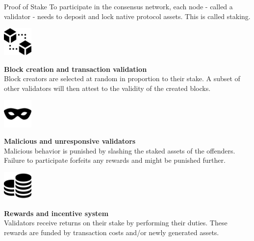 \documentclass[]{beamer}
\begin{document}
	\begin{frame}{Proof of Stake}
		\small
		To participate in the consensus network, each node - called a validator - needs to \color{focus} deposit and lock native protocol assets\color{black}. This is called staking.
		
		\pause
		\vspace{1.5 em}
		\begin{minipage}{0.2\textwidth}
			\begin{center}
				\includegraphics[height=4em]{../assets/images/blocks}
			\end{center}
		\end{minipage}
		\begin{minipage}{0.7\textwidth}
			\textbf{Block creation and transaction validation} \\
			Block creators are selected at random in proportion to their stake. A subset of other validators will then attest to the validity of the created blocks.
		\end{minipage}
	
		\pause
		\vspace{1.5 em}
		\begin{minipage}{0.2\textwidth}
			\begin{center}
				\includegraphics[height=4em]{../assets/images/mask}
			\end{center}
		\end{minipage}
		\begin{minipage}{0.7\textwidth}
			\textbf{Malicious and unresponsive validators} \\
			Malicious behavior is punished by slashing the staked assets of the offenders. Failure to participate forfeits any rewards and might be punished further.
		\end{minipage}
	
		\pause
		\vspace{1.5 em}
		\begin{minipage}{0.2\textwidth}
			\begin{center}
				\includegraphics[height=4em]{../assets/images/coin-stack}
			\end{center}
		\end{minipage}
		\begin{minipage}{0.7\textwidth}
			\textbf{Rewards and incentive system} \\
			Validators receive returns on their stake by performing their duties. These rewards are funded by transaction costs and/or newly generated assets.
		\end{minipage}
	\end{frame}
	
\end{document}
